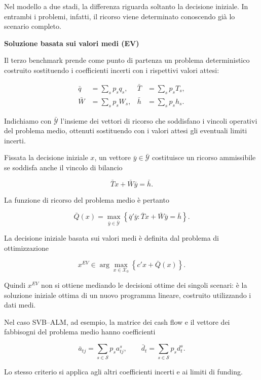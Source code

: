 Nel modello a due stadi, la differenza riguarda
soltanto la decisione iniziale. In entrambi
i problemi, infatti, il ricorso viene determinato
conoscendo gi\`a lo scenario completo.

\medskip

\noindent
\textbf{Soluzione basata sui valori medi (EV)}

Il terzo benchmark prende come punto di partenza
un problema deterministico costruito sostituendo
i coefficienti incerti con i rispettivi
valori attesi:

\[
\begin{aligned}
\bar q&=\sum_s p_s q_s,
&
\bar T&=\sum_s p_s T_s,
\\[4pt]
\bar W&=\sum_s p_s W_s,
&
\bar h&=\sum_s p_s h_s.
\end{aligned}
\]

Indichiamo con $\bar{\mathcal Y}$ l'insieme
dei vettori di ricorso che soddisfano
i vincoli operativi del problema medio,
ottenuti sostituendo con i valori attesi
gli eventuali limiti incerti.

Fissata la decisione iniziale $x$,
un vettore $\bar y\in\bar{\mathcal Y}$
costituisce un ricorso ammissibile
se soddisfa anche il vincolo di bilancio

\[
\bar T x+\bar W\bar y=\bar h.
\]

La funzione di ricorso del problema medio
\`e pertanto

\[
\bar Q(x)
=
\max_{\bar y\in\bar{\mathcal Y}}
\left\{
\bar q'\bar y:
\bar T x+\bar W\bar y=\bar h
\right\}.
\]

La decisione iniziale basata sui valori medi
\`e definita dal problema di ottimizzazione

\begin{equation}
\boxed{
x^{EV}
\in
\arg\max_{x\in\mathcal X_0}
\left\{
c'x+\bar Q(x)
\right\}.
}
\label{eq:cap15-decisione-ev-v2}
\end{equation}

Quindi $x^{EV}$ non si ottiene mediando
le decisioni ottime dei singoli scenari:
\`e la soluzione iniziale ottima
di un nuovo programma lineare,
costruito utilizzando i dati medi.

Nel caso SVB--ALM, ad esempio,
la matrice dei cash flow e il vettore
dei fabbisogni del problema medio
hanno coefficienti

\[
\bar a_{tj}
=
\sum_{s\in\mathcal S}p_s a_{tj}^s,
\qquad
\bar d_t
=
\sum_{s\in\mathcal S}p_s d_t^s.
\]

Lo stesso criterio si applica agli altri
coefficienti incerti e ai limiti di funding.

